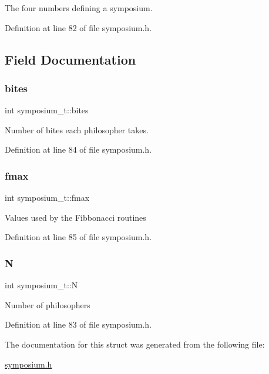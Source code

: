 The four numbers defining a symposium. 

Definition at line 82 of file symposium.\+h.



\subsection{Field Documentation}
\mbox{\label{structsymposium__t_a9ee1b978200b8a4b7c30b170c1f20643}} 
\subsubsection{\texorpdfstring{bites}{bites}}
{\footnotesize\ttfamily int symposium\+\_\+t\+::bites}

Number of bites each philosopher takes. 

Definition at line 84 of file symposium.\+h.

\mbox{\label{structsymposium__t_a038b49a350225fed31d5c148a9147ec6}} 
\subsubsection{\texorpdfstring{fmax}{fmax}}
{\footnotesize\ttfamily int symposium\+\_\+t\+::fmax}

Values used by the Fibbonacci routines 

Definition at line 85 of file symposium.\+h.

\mbox{\label{structsymposium__t_a4e366c10036b2d89ebc2dbcdefba8999}} 
\subsubsection{\texorpdfstring{N}{N}}
{\footnotesize\ttfamily int symposium\+\_\+t\+::N}

Number of philosophers 

Definition at line 83 of file symposium.\+h.



The documentation for this struct was generated from the following file\+:\begin{DoxyCompactItemize}
\item 
\hyperlink{symposium_8h}{symposium.\+h}\end{DoxyCompactItemize}

